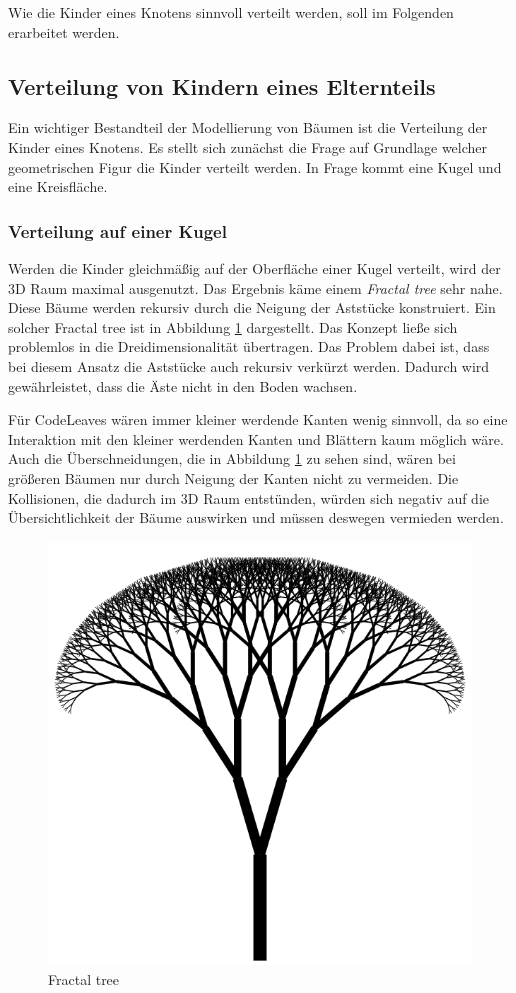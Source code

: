 Wie die Kinder eines Knotens sinnvoll verteilt werden, soll im Folgenden erarbeitet werden.

\subsection{Verteilung von Kindern eines Elternteils}
\label{subsec:leaf-distribution}

Ein wichtiger Bestandteil der Modellierung von Bäumen ist die Verteilung der Kinder eines Knotens. Es stellt sich zunächst die Frage auf Grundlage welcher geometrischen Figur die Kinder verteilt werden. In Frage kommt eine Kugel und eine Kreisfläche.

\subsubsection*{Verteilung auf einer Kugel} 
Werden die Kinder gleichmäßig auf der Oberfläche einer Kugel verteilt, wird der 3D Raum maximal ausgenutzt. Das Ergebnis käme einem \textit{Fractal tree} sehr nahe. Diese Bäume werden rekursiv durch die Neigung der Aststücke konstruiert. Ein solcher Fractal tree ist in Abbildung \ref{fig:fractal-tree} dargestellt. Das Konzept ließe sich problemlos in die Dreidimensionalität übertragen. Das Problem dabei ist, dass bei diesem Ansatz die Aststücke auch rekursiv verkürzt werden. Dadurch wird gewährleistet, dass die Äste nicht in den Boden wachsen.

Für CodeLeaves wären immer kleiner werdende Kanten wenig sinnvoll, da so eine Interaktion mit den kleiner werdenden Kanten und Blättern kaum möglich wäre. Auch die Überschneidungen, die in Abbildung \ref{fig:fractal-tree} zu sehen sind, wären bei größeren Bäumen nur durch Neigung der Kanten nicht zu vermeiden. Die Kollisionen, die dadurch im 3D Raum entstünden, würden sich negativ auf die Übersichtlichkeit der Bäume auswirken und müssen deswegen vermieden werden.

\begin{figure}[htb]
  \includegraphics[width=.5\textwidth]{figures/fractal-tree}
  \caption{Fractal tree \cite{rocchini2017fractal}}
  \label{fig:fractal-tree}
\end{figure}

